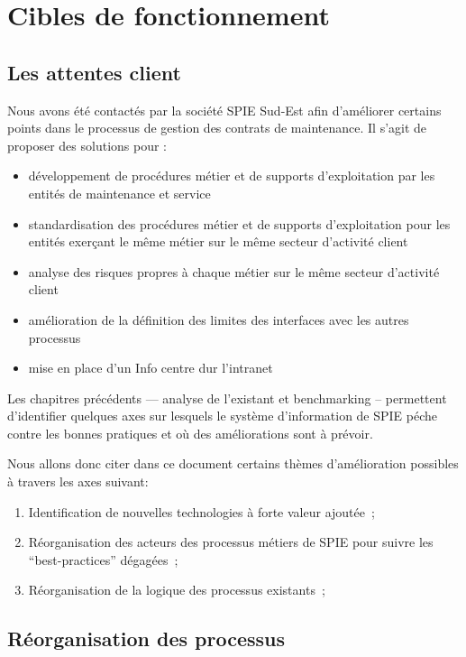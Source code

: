 \chapter{Cibles de fonctionnement}

\section{Les attentes client}

Nous avons été contactés par la société SPIE Sud-Est afin d'améliorer certains points dans le processus de gestion des contrats de maintenance. Il s'agit de proposer des solutions pour : 

\begin{itemize}
    \item développement de procédures métier et de supports d'exploitation par les entités de maintenance et service
    \item standardisation des procédures métier et de supports d'exploitation pour les entités exerçant le même métier sur le même secteur d'activité client
    \item analyse des risques propres à chaque métier sur le même secteur d'activité client
    \item amélioration de la définition des limites des interfaces avec les autres processus
    \item mise en place d'un Info centre dur l'intranet
\end{itemize}

Les chapitres précédents --- analyse de l'existant et benchmarking -- permettent d'identifier quelques axes sur lesquels le système d'information de SPIE péche contre les bonnes pratiques et où des améliorations sont à prévoir.

    Nous allons donc citer dans ce document certains thèmes d'amélioration possibles à travers les axes suivant:

    \begin{enumerate}
        \item Identification de nouvelles technologies à forte valeur ajoutée~;
        \item Réorganisation des acteurs des processus métiers de SPIE pour suivre les ``best-practices'' dégagées~;
        \item Réorganisation de la logique des processus existants~;
    \end{enumerate}

\section{Réorganisation des processus}

